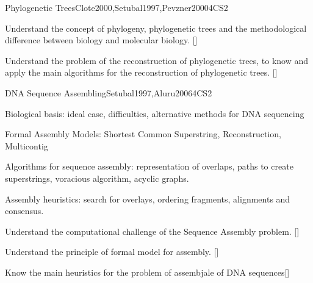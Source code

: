 \begin{syllabus}
\begin{unit}{Phylogenetic Trees}{}{Clote2000,Setubal1997,Pevzner2000}{4}{CS2}
\begin{learningoutcomes}
\item Understand the concept of phylogeny, phylogenetic trees and the methodological difference between biology and molecular biology. [\Familiarity]
\item Understand the problem of the reconstruction of phylogenetic trees, to know and apply the main algorithms for the reconstruction of phylogenetic trees. [\Assessment]
\end{learningoutcomes}
\end{unit}

\begin{unit}{DNA Sequence Assembling}{}{Setubal1997,Aluru2006}{4}{CS2}
\begin{topics}
\item Biological basis: ideal case, difficulties, alternative methods for DNA sequencing
\item Formal Assembly Models: Shortest Common Superstring, Reconstruction, Multicontig
\item Algorithms for sequence assembly: representation of overlaps, paths to create superstrings, voracious algorithm, acyclic graphs.
\item Assembly heuristics: search for overlays, ordering fragments, alignments and consensus.
\end{topics}

\begin{learningoutcomes}
\item Understand the computational challenge of the Sequence Assembly problem. [\Familiarity]
\item Understand the principle of formal model for assembly. [\Assessment]
\item Know the main heuristics for the problem of assembjale of DNA sequences[\Usage]
\end{learningoutcomes}
\end{unit}


\end{syllabus}
